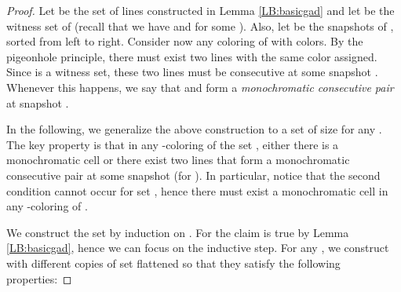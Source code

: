 \documentclass[11pt,a4paper]{article}
\begin{document}
\begin{proof}
Let  be the set of lines constructed in Lemma \ref{LB:basicgad} and let  be the witness set of  (recall that we have  and  for some ). Also, let  be the snapshots of , sorted from left to right. Consider now any coloring of  with  colors. By the pigeonhole principle, there must exist two lines  with the same color assigned. Since  is a witness set, these two lines must be consecutive at some snapshot . Whenever this happens, we say that  and  form a {\em monochromatic consecutive pair} at snapshot .

In the following, we generalize the above construction to a set  of size  for any . The key property is that in any -coloring of the set , either there is a monochromatic cell or there exist two lines that form a monochromatic consecutive pair at some snapshot  (for ). In particular, notice that the second condition cannot occur for set , hence  there must exist a monochromatic cell in any -coloring of .

We construct the set  by induction on . For  the claim is true by Lemma \ref{LB:basicgad}, hence we can focus on the inductive step. For any , we construct  with  different copies of set  flattened so that they satisfy the following properties:

\iffalse
\begin{figure}
   \begin{center}
     \texttt{[image: fig\_induc]}
     \caption{Construction of the set  by combining  different copies of . In the Figure, each thick line represents a copy of  (and the dotted vertical lines the snapshots of , for ). Observe that all the crossings between lines of different copies occur in the vertical strip  (depicted as light gray in the figure). Since no crossing between lines of the same copy occur in the strip, the vertical ordering of the lines of a single copy at any position in the strip is exactly .
     In the right we depict a larger image of the crossing between two copies of . The main property is that any two consecutive lines of a copy of  form a quadrilateral with any other pair of consecutive lines of another copy of .}
     \label{fig_induc}
   \end{center}
\end{figure}
\fi


\end{proof}
\end{document}
